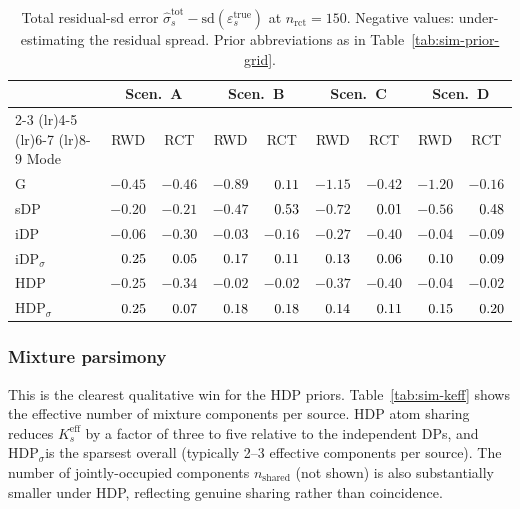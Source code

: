 \documentclass[11pt]{article}
\theoremstyle{plain}
\theoremstyle{definition}
\theoremstyle{remark}
\newcommand{\1}{\mathds{1}}
\newcommand{\mHDPs}{\ensuremath{\mathrm{HDP}_\sigma}}
\begin{document}
\begin{table}[tb]
\centering
\small
\caption{Total residual-sd error
$\hat\sigma^{\text{tot}}_s - \mathrm{sd}(\varepsilon_s^{\text{true}})$
at $n_{\text{rct}} = 150$. Negative values: under-estimating the
residual spread. Prior abbreviations as in
Table~\ref{tab:sim-prior-grid}.}
\label{tab:sim-totalsd}
\begin{tabular}{lcccc cccc}
\toprule
& \multicolumn{2}{c}{Scen.\ A} & \multicolumn{2}{c}{Scen.\ B}
& \multicolumn{2}{c}{Scen.\ C} & \multicolumn{2}{c}{Scen.\ D} \\
\cmidrule(lr){2-3} \cmidrule(lr){4-5} \cmidrule(lr){6-7} \cmidrule(lr){8-9}
Mode & RWD & RCT & RWD & RCT & RWD & RCT & RWD & RCT \\
\midrule
G            & $-0.45$ & $-0.46$ & $-0.89$ & $\hphantom{-}0.11$ & $-1.15$ & $-0.42$ & $-1.20$ & $-0.16$ \\
sDP          & $-0.20$ & $-0.21$ & $-0.47$ & $\hphantom{-}0.53$ & $-0.72$ & $\hphantom{-}0.01$ & $-0.56$ & $\hphantom{-}0.48$ \\
iDP          & $-0.06$ & $-0.30$ & $-0.03$ & $-0.16$ & $-0.27$ & $-0.40$ & $-0.04$ & $-0.09$ \\
iDP$_\sigma$ & $\hphantom{-}0.25$ & $\hphantom{-}0.05$ & $\hphantom{-}0.17$ & $\hphantom{-}0.11$ & $\hphantom{-}0.13$ & $\hphantom{-}0.06$ & $\hphantom{-}0.10$ & $\hphantom{-}0.09$ \\
HDP          & $-0.25$ & $-0.34$ & $-0.02$ & $-0.02$ & $-0.37$ & $-0.40$ & $-0.04$ & $-0.02$ \\
HDP$_\sigma$ & $\hphantom{-}0.25$ & $\hphantom{-}0.07$ & $\hphantom{-}0.18$ & $\hphantom{-}0.18$ & $\hphantom{-}0.14$ & $\hphantom{-}0.11$ & $\hphantom{-}0.15$ & $\hphantom{-}0.20$ \\
\bottomrule
\end{tabular}
\end{table}

\subsubsection*{Mixture parsimony}

This is the clearest qualitative win for the HDP priors.
Table~\ref{tab:sim-keff} shows the effective number of mixture
components per source. HDP atom sharing reduces
$K^{\text{eff}}_s$ by a factor of three to five relative to the
independent DPs, and \mHDPs is the sparsest
overall (typically 2--3 effective components per source). The number
of jointly-occupied components $n_{\text{shared}}$ (not shown) is
also substantially smaller under HDP, reflecting genuine sharing
rather than coincidence.
\end{document}
